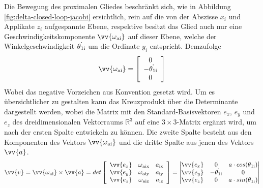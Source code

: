 \documentclass[Bachelor, BMR, ngerman]{twbook}
\begin{document}
    \noindent
    Die Bewegung des proximalen Gliedes beschränkt sich, wie in Abbildung \ref{fig:delta-closed-loop-jacobi} ersichtlich, rein auf die von der Abszisse $x_i$ und Applikate $z_i$ aufgespannte Ebene, respektive besitzt das Glied auch nur eine Geschwindigkeitskomponente $\vv{\omega\textsubscript{ai}}$ auf dieser Ebene, welche der Winkelgeschwindigkeit $\dot{\theta\textsubscript{1i}}$ um die Ordinate $y_i$ entspricht. Demzufolge
    \newline
    \begin{align}
        \vv{\omega\textsubscript{ai}} =
        \left[
            \begin{array}{c} 
                0 \\
                - \dot{\theta\textsubscript{1i}}\\
                0
            \end{array}
        \right]
        \label{eq:omega_ai}
    \end{align}
    \noindent
    Wobei das negative Vorzeichen aus Konvention gesetzt wird. Um es übersichtlicher zu gestalten kann das Kreuzprodukt über die Determinante dargestellt werden, wobei die Matrix mit den Standard-Basisvektoren $e_x$, $e_y$ und $e_z$ des dreidimensionalen Vektorraums $\mathbb{R}^3$ auf eine $3 \times 3$-Matrix ergänzt wird, um nach der ersten Spalte entwickeln zu können. Die zweite Spalte besteht aus den Komponenten des Vektors $\vv{\omega\textsubscript{ai}}$ und die dritte Spalte aus jenen des Vektors $\vv{a}$.
    \newline
    \begin{align}
        \vv{v} = \vv{\omega\textsubscript{ai}} \times \vv{a} = det
        \left[
            \begin{array}{c c c}
            \vv{e_x} & \omega\textsubscript{aix} & a\textsubscript{ix} \\
            \vv{e_y} & \omega\textsubscript{aiy} & a\textsubscript{iy} \\
            \vv{e_z} & \omega\textsubscript{aiz} & a\textsubscript{iz}  
            \end{array}
        \right] =
        \begin{vmatrix}
            \vv{e_x} & 0 & a \cdot cos(\theta\textsubscript{1i}) \\
            \vv{e_y} & - \dot{\theta\textsubscript{1i}} & 0 \\
            \vv{e_z} & 0 & a \cdot sin(\theta\textsubscript{1i})  
        \end{vmatrix} 
        \label{eq:kreuzprodukt}
    \end{align}
\end{document}
